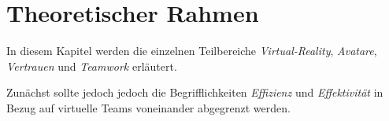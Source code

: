 \documentclass[a4paper,11pt]{article}%
\renewcommand{\\}{\vspace*{0.5\baselineskip} \newline}
\begin{document}
	
	


%
%
%
%

	\newpage
\section{Theoretischer Rahmen}

In diesem Kapitel werden die einzelnen Teilbereiche \textit{Virtual-Reality}, \textit{Avatare}, \textit{Vertrauen} und \textit{Teamwork} erläutert.

Zunächst sollte jedoch jedoch die Begrifflichkeiten \textit{Effizienz} und \textit{Effektivität} in Bezug auf virtuelle Teams voneinander abgegrenzt werden.
\end{document}

